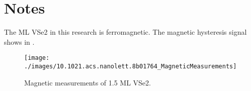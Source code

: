 \section{Notes}
The ML VSe2 in this research is ferromagnetic. The magnetic hysteresis signal shows in .
\begin{figure}
    \texttt{[image: ./images/10.1021.acs.nanolett.8b01764\_MagneticMeasurements]}
	\caption[Magnetic measurements of 1.5 ML VSe2]{
		Magnetic measurements of 1.5 ML VSe2.
	}
\end{figure}